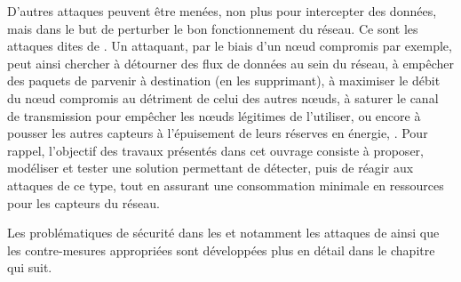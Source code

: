D'autres attaques peuvent être menées, non plus pour intercepter des données, mais dans le but de perturber le bon fonctionnement du réseau.
Ce sont les attaques dites de \textit{\dds}.
Un attaquant, par le biais d'un nœud compromis par exemple, peut ainsi chercher à détourner des flux de données au sein du réseau, à empêcher des paquets de parvenir à destination (en les supprimant), à maximiser le débit du nœud compromis au détriment de celui des autres nœuds, à saturer le canal de transmission pour empêcher les nœuds légitimes de l'utiliser, ou encore à pousser les autres capteurs à l'épuisement de leurs réserves en énergie, \etc.
Pour rappel, l'objectif des travaux présentés dans cet ouvrage consiste à proposer, modéliser et tester une solution permettant de détecter, puis de réagir aux attaques de ce type, tout en assurant une consommation minimale en ressources pour les capteurs du réseau.

Les problématiques de sécurité dans les \rcs et notamment les attaques de \dds ainsi que les contre-mesures appropriées sont développées plus en détail dans le chapitre qui suit.
